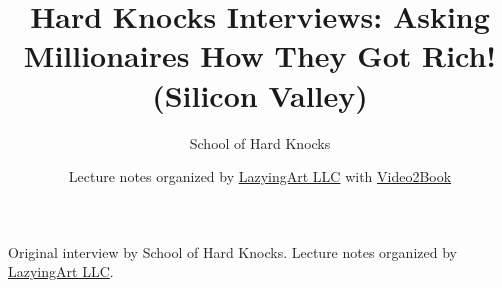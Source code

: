 \documentclass[11pt,oneside]{book}
\begin{document}
\frontmatter
\title{Hard Knocks Interviews: Asking Millionaires How They Got Rich! (Silicon Valley)}
\author{School of Hard Knocks}
\date{Lecture notes organized by \href{https://lazying.art}{LazyingArt LLC} with \href{https://github.com/lachlanchen/Video2Book}{Video2Book}}
\maketitle
\begin{center}
\small Original interview by School of Hard Knocks. Lecture notes organized by \href{https://lazying.art}{LazyingArt LLC}.
\end{center}
\clearpage
\mainmatter

\end{document}
